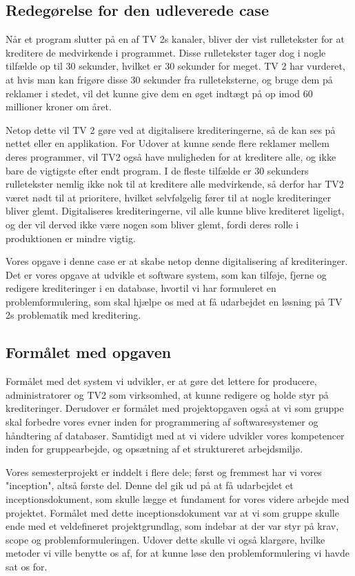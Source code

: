\subsection{Redegørelse for den udleverede case}
Når et program slutter på en af TV 2s kanaler, bliver der vist rulletekster for at kreditere de medvirkende i programmet. Disse rulletekster tager dog i nogle tilfælde op til 30 sekunder, hvilket er 30 sekunder for meget. TV 2 har vurderet, at hvis man kan frigøre disse 30 sekunder fra rulleteksterne, og bruge dem på reklamer i stedet, vil det kunne give dem en øget indtægt på op imod 60 millioner kroner om året. \cite{url_case}

Netop dette vil TV 2 gøre ved at digitalisere krediteringerne, så de kan ses på nettet eller en applikation. For Udover at kunne sende flere reklamer mellem deres programmer, vil TV2 også have muligheden for at kreditere alle, og ikke bare de vigtigste efter endt program. I de fleste tilfælde er 30 sekunders rulletekster nemlig ikke nok til at kreditere alle medvirkende, så derfor har TV2 været nødt til at prioritere, hvilket selvfølgelig fører til at nogle krediteringer bliver glemt. Digitaliseres krediteringerne, vil alle kunne blive krediteret ligeligt, og der vil derved ikke være nogen som bliver glemt, fordi deres rolle i produktionen er mindre vigtig.

Vores opgave i denne case er at skabe netop denne digitalisering af krediteringer. Det er vores opgave at udvikle et software system, som kan tilføje, fjerne og redigere krediteringer i en database, hvortil vi har formuleret en problemformulering, som skal hjælpe os med at få udarbejdet en løsning på TV 2s problematik med kreditering.

\subsection{Formålet med opgaven}
Formålet med det system vi udvikler, er at gøre det lettere for producere, administratorer og TV2 som virksomhed, at kunne redigere og holde styr på krediteringer. Derudover er formålet med projektopgaven også at vi som gruppe skal forbedre vores evner inden for programmering af softwaresystemer og håndtering af databaser. Samtidigt med at vi videre udvikler vores kompetencer inden for gruppearbejde, og opsætning af et struktureret arbejdsmiljø.

Vores semesterprojekt er inddelt i flere dele; først og fremmest har vi vores "inception", altså første del. Denne del gik ud på at få udarbejdet et inceptionsdokument, som skulle lægge et fundament for vores videre arbejde med projektet. Formålet med dette inceptionsdokument var at vi som gruppe skulle ende med et veldefineret projektgrundlag, som indebar at der var styr på krav, scope og problemformuleringen. Udover dette skulle vi også klargøre, hvilke metoder vi ville benytte os af, for at kunne løse den problemformulering vi havde sat os for.

